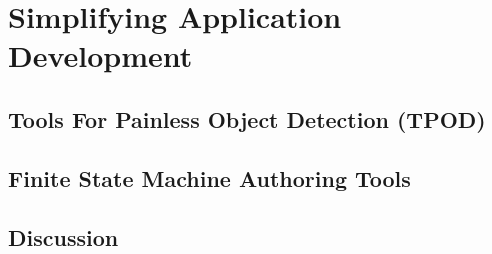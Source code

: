 \chapter{Simplifying Application Development}
\label{chapter: dev}

\section{Tools For Painless Object Detection (TPOD)}
\section{Finite State Machine Authoring Tools}
\section{Discussion}
